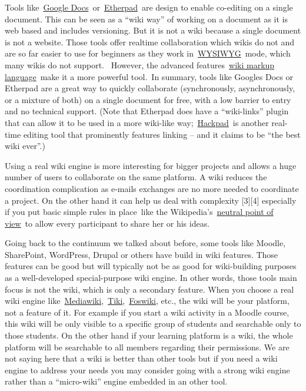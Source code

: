 Tools like~\href{https://docs.google.com/}{Google
Docs}~or~\href{http://en.wikipedia.org/wiki/Etherpad}{Etherpad}~are
design to enable co-editing on a single document. This can be seen as a
``wiki way'' of working on a document as it is web based and includes
versioning. But it is not a wiki because a single document is not a
website. Those tools offer realtime collaboration which wikis do not and
are so far easier to use for beginners as they work
in~\href{http://en.wikipedia.org/wiki/WYSIWYG}{WYSIWYG}~mode, which many
wikis do not support. ~However, the advanced
features~\href{http://en.wikipedia.org/wiki/Wiki\_syntax}{wiki markup
language}~make it a more powerful tool.~In summary, tools like Googles
Docs or Etherpad are a great way to quickly collaborate (synchronously,
asynchronously, or a mixture of both) on a single document for free,
with a low barrier to entry and no technical support. (Note that
Etherpad does have a ``wiki-links'' plugin that can allow it to be used
in a more wiki-like way;~\href{https://hackpad.com/}{Hackpad}~is another
real-time editing tool that prominently features linking -- and it
claims to be ``the best wiki ever''.)

Using a real wiki engine is more interesting for bigger projects and
allows a huge number of users to collaborate on the same platform. A
wiki reduces the coordination complication as e-mails exchanges are no
more needed to coordinate a project. On the other hand it can help us
deal with complexity {[}3{]}{[}4{]} especially if you put basic simple
rules in place~like the
Wikipedia's~\href{http://en.wikipedia.org/wiki/NPOV}{neutral point of
view}~to allow every participant to share her or his ideas.

Going back to the continuum we talked about before, some tools like
Moodle, SharePoint, WordPress, Drupal or others have build in wiki
features. Those features can be good but will typically not be as good
for wiki-building purposes as a well-developed special-purpose wiki
engine. In other words, those tools main focus is not the wiki, which is
only a secondary feature. When you choose a real wiki engine
like~\href{http://www.mediawiki.org/}{Mediawiki},~\href{http://www.tiki.org/}{Tiki},~\href{http://foswiki.org/}{Foswiki},
etc., the wiki will be your platform, not a feature of it. For example
if you start a wiki activity in a Moodle course, this wiki will be only
visible to a specific group of students and searchable only to those
students. On the other hand if your learning platform is a wiki, the
whole platform will be searchable to all members regarding their
permissions. We are not saying here that a wiki is better than other
tools but if you need a wiki engine to address your needs you may
consider going with a strong wiki engine rather than a ``micro-wiki''
engine embedded in an other tool.

